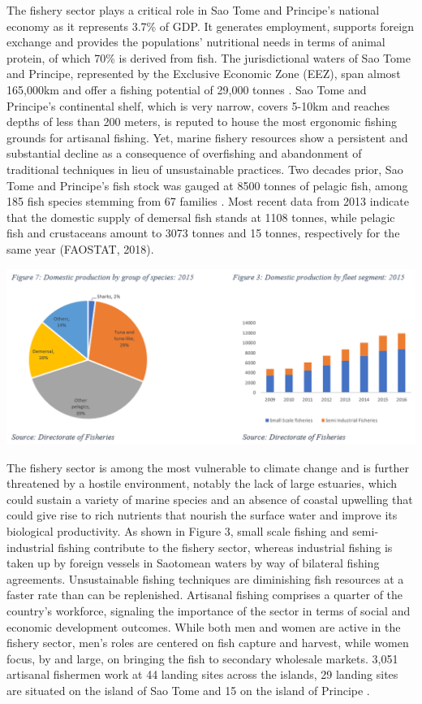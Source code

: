 \documentclass[
]{book}
\begin{document}
The fishery sector plays a critical role in Sao Tome and Principe's national economy as it represents 3.7\% of GDP. It generates employment, supports foreign exchange and provides the populations' nutritional needs in terms of animal protein, of which 70\% is derived from fish. The jurisdictional waters of Sao Tome and Principe, represented by the Exclusive Economic Zone (EEZ), span almost 165,000km and offer a fishing potential of 29,000 tonnes . Sao Tome and Principe's continental shelf, which is very narrow, covers 5-10km and reaches depths of less than 200 meters, is reputed to house the most ergonomic fishing grounds for artisanal fishing. Yet, marine fishery resources show a persistent and substantial decline as a consequence of overfishing and abandonment of traditional techniques in lieu of unsustainable practices. Two decades prior, Sao Tome and Principe's fish stock was gauged at 8500 tonnes of pelagic fish, among 185 fish species stemming from 67 families . Most recent data from 2013 indicate that the domestic supply of demersal fish stands at 1108 tonnes, while pelagic fish and crustaceans amount to 3073 tonnes and 15 tonnes, respectively for the same year (FAOSTAT, 2018).

\includegraphics{images/fish_production.png}

The fishery sector is among the most vulnerable to climate change and is further threatened by a hostile environment, notably the lack of large estuaries, which could sustain a variety of marine species and an absence of coastal upwelling that could give rise to rich nutrients that nourish the surface water and improve its biological productivity. As shown in Figure 3, small scale fishing and semi-industrial fishing contribute to the fishery sector, whereas industrial fishing is taken up by foreign vessels in Saotomean waters by way of bilateral fishing agreements. Unsustainable fishing techniques are diminishing fish resources at a faster rate than can be replenished. Artisanal fishing comprises a quarter of the country's workforce, signaling the importance of the sector in terms of social and economic development outcomes. While both men and women are active in the fishery sector, men's roles are centered on fish capture and harvest, while women focus, by and large, on bringing the fish to secondary wholesale markets. 3,051 artisanal fishermen work at 44 landing sites across the islands, 29 landing sites are situated on the island of Sao Tome and 15 on the island of Principe .
\end{document}
